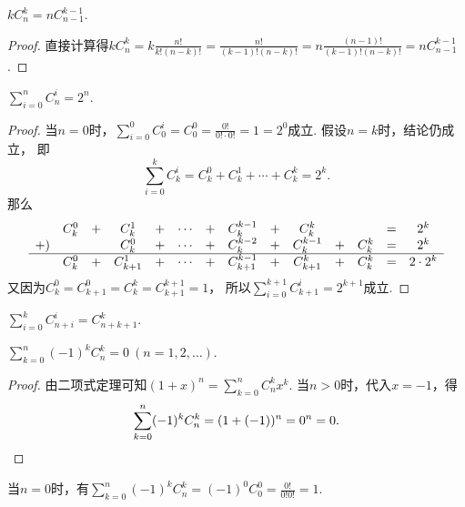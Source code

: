 \begin{property}
\(k C_n^k = n C_{n-1}^{k-1}\).
\begin{proof}
直接计算得\(
	k C_n^k
	= k \frac{n!}{k!(n-k)!}
	= \frac{n!}{(k-1)!(n-k)!}
	= n \frac{(n-1)!}{(k-1)!(n-k)!}
	= n C_{n-1}^{k-1}
\).
\end{proof}
\end{property}

\begin{property}\label{theorem:组合数性质3}
\(\sum_{i=0}^n C_n^i = 2^n\).
\begin{proof}
当\(n=0\)时，\(\sum_{i=0}^0 C_0^i = C_0^0 = \frac{0!}{0! \cdot 0!} = 1 = 2^0\)成立.
假设\(n=k\)时，结论仍成立，
即\begin{equation*}
	\sum_{i=0}^k C_k^i
	= C_k^0 + C_k^1 + \dotsb + C_k^k = 2^k.
\end{equation*}
那么\begin{equation*}
	\begin{array}{*{14}{c}}
		& C_k^0 &+& C_k^1 &+& \dotsb &+& C_k^{k-1} &+& C_k^k && &=& 2^k \\
		+) & && C_k^0 &+& \dotsb &+& C_k^{k-2} &+& C_k^{k-1} &+& C_k^k &=& 2^k \\ \hline
		& C_k^0 &+& C_{k+1}^1 &+& \dotsb &+& C_{k+1}^{k-1} &+& C_{k+1}^k &+& C_k^k &=& 2 \cdot 2^k
	\end{array}
\end{equation*}
又因为\(C_k^0 = C_{k+1}^0 = C_k^k = C_{k+1}^{k+1} = 1\)，
所以\(
	\sum_{i=0}^{k+1} C_{k+1}^i = 2^{k+1}
\)成立.
\end{proof}
\end{property}

\begin{property}
\(
	\sum_{i=0}^k C_{n+i}^i
	= C_{n+k+1}^k
\).
\end{property}

\begin{property}\label{theorem:组合数性质4}
\(\sum_{k=0}^n (-1)^k C_n^k = 0\ (n=1,2,\dotsc)\).
\begin{proof}
由二项式定理可知\(
	(1+x)^n
	= \sum_{k=0}^n C_n^k x^k
\).
当\(n>0\)时，代入\(x = -1\)，得\begin{equation*}
	\sum_{k=0}^n (-1)^k C_n^k
	= (1+(-1))^n
	= 0^n
	= 0.
	\qedhere
\end{equation*}
\end{proof}
\end{property}
\begin{remark}
当\(n=0\)时，有\(\sum_{k=0}^n (-1)^k C_n^k = (-1)^0 C_0^0 = \frac{0!}{0!0!} = 1\).
\end{remark}

